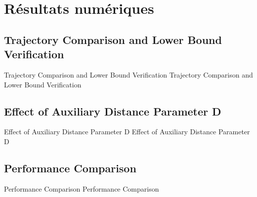 \section{Résultats numériques}


\subsection{Trajectory Comparison and Lower Bound Verification}
\begin{frame}{Trajectory Comparison and Lower Bound Verification}
Trajectory Comparison and Lower Bound Verification 
\end{frame}


\subsection{Effect of Auxiliary Distance Parameter D}
\begin{frame}{Effect of Auxiliary Distance Parameter D}
Effect of Auxiliary Distance Parameter D
\end{frame}


\subsection{Performance Comparison}
\begin{frame}{Performance Comparison}
Performance Comparison
\end{frame}
